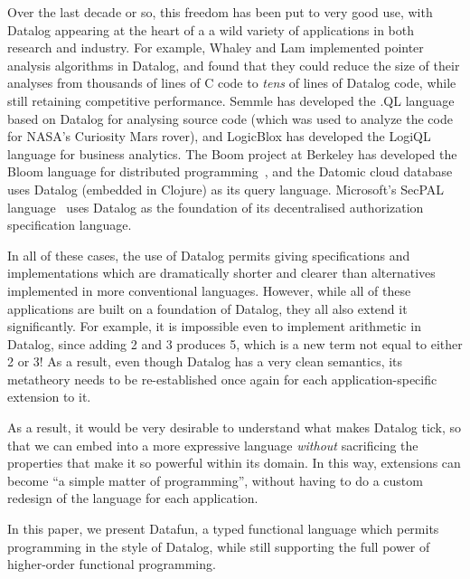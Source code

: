 Over the last decade or so, this freedom has been put to very good
use, with Datalog appearing at the heart of a a wild variety of
applications in both research and industry. For example, Whaley and
Lam \cite{whaley-lam,whaley-phd} implemented pointer analysis
algorithms in Datalog, and found that they could reduce the size of
their analyses from thousands of lines of C code to \emph{tens} of
lines of Datalog code, while still retaining competitive performance.
Semmle has developed the .QL language~\cite{semmlecode,ql-inference}
based on Datalog for analysing source code (which was used to analyze
the code for NASA's Curiosity Mars rover), and LogicBlox has developed
the LogiQL~\cite{logicblox} language for business analytics. The Boom
project at Berkeley has developed the Bloom language for distributed
programming~\cite{bloom}, and the Datomic cloud
database~\cite{datomic} uses Datalog (embedded in Clojure) as its
query language. Microsoft's SecPAL language~\cite{secpal} uses Datalog
as the foundation of its decentralised authorization specification
language.

In all of these cases, the use of Datalog permits giving
specifications and implementations which are dramatically shorter and
clearer than alternatives implemented in more conventional languages.
However, while all of these applications are built on a foundation of
Datalog, they all also extend it significantly. For example, it is
impossible even to implement arithmetic in Datalog, since adding 2 and
3 produces 5, which is a new term not equal to either 2 or 3! As a
result, even though Datalog has a very clean semantics, its metatheory
needs to be re-established once again for each application-specific
extension to it.

As a result, it would be very desirable to understand what makes
Datalog tick, so that we can embed into a more expressive language
\emph{without} sacrificing the properties that make it so powerful
within its domain. In this way, extensions can become ``a simple
matter of programming'', without having to do a custom redesign of the
language for each application.

In this paper, we present Datafun, a typed functional language which
permits programming in the style of Datalog, while still supporting
the full power of higher-order functional programming.


